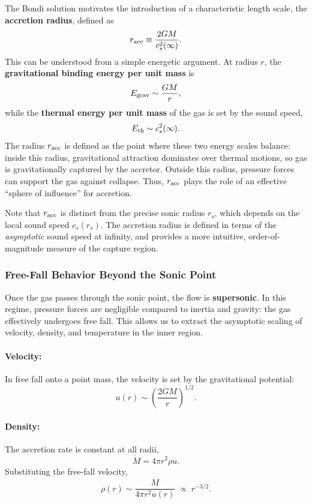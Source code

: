 The Bondi solution motivates the introduction of a characteristic length scale, the
\textbf{accretion radius}, defined as
\begin{equation}
    \label{eq:bondi_radius}
    r_{\rm acc} \equiv \frac{2GM}{c_s^2(\infty)}.
\end{equation}
This can be understood from a simple energetic argument. At radius $r$, the
\textbf{gravitational binding energy per unit mass} is
\[
E_{\rm grav} \sim \frac{GM}{r},
\]
while the \textbf{thermal energy per unit mass} of the gas is set by the sound speed,
\[
E_{\rm th} \sim c_s^2(\infty).
\]
The radius $r_{\rm acc}$ is defined as the point where these two energy scales balance:
inside this radius, gravitational attraction dominates over thermal motions, so gas is
gravitationally captured by the accretor. Outside this radius, pressure forces can
support the gas against collapse. Thus, $r_{\rm acc}$ plays the role of an effective
``sphere of influence'' for accretion.

\begin{remark}
Note that $r_{\rm acc}$ is distinct from the precise sonic radius $r_s$, which depends
on the local sound speed $c_s(r_s)$. The accretion radius is defined in terms of the
\emph{asymptotic} sound speed at infinity, and provides a more intuitive, order-of-magnitude
measure of the capture region.
\end{remark}

\subsubsection{Free-Fall Behavior Beyond the Sonic Point}

Once the gas passes through the sonic point, the flow is \textbf{supersonic}. In this
regime, pressure forces are negligible compared to inertia and gravity: the gas
effectively undergoes free fall. This allows us to extract the asymptotic scaling of
velocity, density, and temperature in the inner region.

\paragraph{Velocity:} In free fall onto a point mass, the velocity is set by the
gravitational potential:
\[
u(r) \sim \left(\frac{2GM}{r}\right)^{1/2}.
\]

\paragraph{Density:} The accretion rate is constant at all radii,
\[
\dot{M} = 4\pi r^2 \rho u.
\]
Substituting the free-fall velocity,
\[
\rho(r) \sim \frac{\dot{M}}{4\pi r^2 u(r)} \;\propto\; r^{-3/2}.
\]


